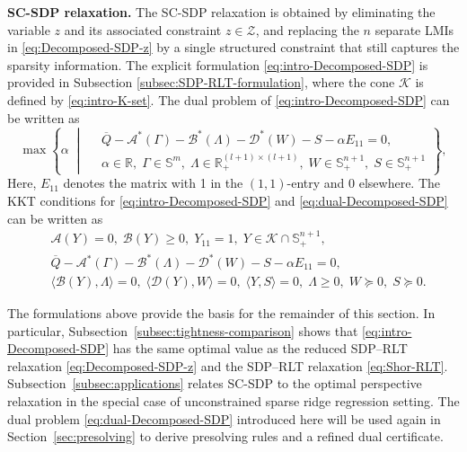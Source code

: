 \documentclass[11pt]{article}
\def\D{\mathcal{D}}
\def\A{\mathcal{A}}
\def\B{\mathcal{B}}
\def\K{\mathcal{K}}
\def\R{\mathbb{R}}
\def\S{\mathbb{S}}
\def\tb#1{\textbf{#1}}
\def\bQ{\overline{Q}}
\theoremstyle{plain}
\begin{document}
\medskip
\noindent\tb{SC-SDP relaxation.}
The SC-SDP relaxation is obtained by 
eliminating the variable $z$ and its associated constraint $z\in \mathcal{Z}$, and 
replacing the $n$ separate LMIs in \eqref{eq:Decomposed-SDP-z} by a single structured constraint that still captures the sparsity information. The explicit formulation \eqref{eq:intro-Decomposed-SDP} is provided in Subsection \ref{subsec:SDP-RLT-formulation}, where the cone $\K$ is defined by \eqref{eq:intro-K-set}.
The dual problem of \eqref{eq:intro-Decomposed-SDP} can be written as
\begingroup
\renewcommand{\theequation}{D}
\begin{equation}\label{eq:dual-Decomposed-SDP}
\max\left\{ \alpha
\;\middle|\;
\begin{aligned}
&\bQ-\A^* (\Gamma) - \B^* (\Lambda)-\D^*(W) - S-\alpha E_{11}=0,\\
&\alpha\in\R,\;\Gamma\in\S^{m},\;\Lambda\in\R^{(l+1)\times(l+1)}_+,\;W\in\S^{n+1}_+,\;S\in\S^{n+1}_+
\end{aligned}
\right\}, \tag{D}
\end{equation}
\endgroup
Here, $E_{11}$ denotes the matrix with 1 in the $(1,1)$-entry and 0 elsewhere. The KKT conditions for \eqref{eq:intro-Decomposed-SDP} and \eqref{eq:dual-Decomposed-SDP} can be written as
\begin{equation}
\label{eq:KKT-Decomposed-SDP}
\begin{aligned}
&\A(Y)=0,\; \B(Y)\geq 0,\; Y_{11}=1,\; Y\in \K\cap \S^{n+1}_+,\\
&\bQ-\A^* (\Gamma) - \B^* (\Lambda)-\D^*(W) - S-\alpha E_{11}=0,\\
&\langle \B(Y),\Lambda\rangle=0,\; \langle \D(Y),W\rangle=0,\; \langle Y,S\rangle=0,\; 
\Lambda\geq 0,\; W\succeq 0,\; S\succeq 0.
\end{aligned}
\end{equation}


The formulations above provide the basis for the remainder of this section. In particular, Subsection~\ref{subsec:tightness-comparison} shows that \eqref{eq:intro-Decomposed-SDP} has the same optimal value as the reduced SDP--RLT relaxation \eqref{eq:Decomposed-SDP-z} and the SDP--RLT relaxation \eqref{eq:Shor-RLT}.  Subsection~\ref{subsec:applications} relates SC-SDP to the optimal perspective relaxation in the special case of unconstrained sparse ridge regression setting. The dual problem 
\eqref{eq:dual-Decomposed-SDP} introduced here will be used again in Section~\ref{sec:presolving} to derive presolving rules and a refined dual certificate.
\end{document}
